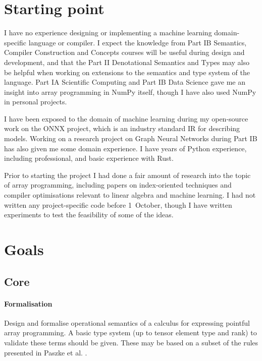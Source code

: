 \needspace{1em}
\section{Starting point}

I have no experience designing or implementing a machine learning domain-specific language or compiler. I expect the knowledge from Part IB Semantics, Compiler Construction and Concepts courses will be useful during design and development, and that the Part II Denotational Semantics and Types may also be helpful when working on extensions to the semantics and type system of the language. Part IA Scientific Computing and Part IB Data Science gave me an insight into array programming in NumPy itself, though I have also used NumPy in personal projects.

I have been exposed to the domain of machine learning during my open-source work on the ONNX project, which is an industry standard IR for describing models. Working on a research project on Graph Neural Networks during Part IB has also given me some domain experience. I have years of Python experience, including professional, and basic experience with Rust.

Prior to starting the project I had done a fair amount of research into the topic of array programming, including papers on index-oriented techniques and compiler optimisations relevant to linear algebra and machine learning. I had not written any project-specific code before 1~October, though I have written experiments to test the feasibility of some of the ideas.

\section{Goals}

\subsection{Core}

\paragraph{Formalisation} Design and formalise operational semantics of a calculus for expressing pointful array programming. A basic type system (up to tensor element type and rank) to validate these terms should be given. These may be based on a subset of the rules presented in Paszke et al. \cite{paszke2021getting}.

